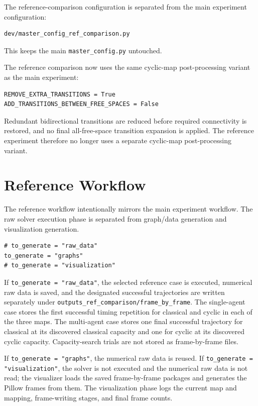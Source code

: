 \documentclass[11pt]{article}
\begin{document}
The reference-comparison configuration is separated from the main experiment configuration:

\begin{lstlisting}
dev/master_config_ref_comparison.py
\end{lstlisting}

This keeps the main \texttt{master\_config.py} untouched.

The reference comparison now uses the same cyclic-map post-processing variant as the main experiment:

\begin{lstlisting}
REMOVE_EXTRA_TRANSITIONS = True
ADD_TRANSITIONS_BETWEEN_FREE_SPACES = False
\end{lstlisting}

Redundant bidirectional transitions are reduced before required connectivity is restored, and no final all-free-space transition expansion is applied. The reference experiment therefore no longer uses a separate cyclic-map post-processing variant.

\section{Reference Workflow}

The reference workflow intentionally mirrors the main experiment workflow. The raw solver execution phase is separated from graph/data generation and visualization generation.

\begin{lstlisting}
# to_generate = "raw_data"
to_generate = "graphs"
# to_generate = "visualization"
\end{lstlisting}

If \texttt{to\_generate = "raw\_data"}, the selected reference case is executed, numerical raw data is saved, and the designated successful trajectories are written separately under \texttt{outputs\_ref\_comparison/frame\_by\_frame}. The single-agent case stores the first successful timing repetition for classical and cyclic in each of the three maps. The multi-agent case stores one final successful trajectory for classical at its discovered classical capacity and one for cyclic at its discovered cyclic capacity. Capacity-search trials are not stored as frame-by-frame files.

If \texttt{to\_generate = "graphs"}, the numerical raw data is reused. If \texttt{to\_generate = "visualization"}, the solver is not executed and the numerical raw data is not read; the visualizer loads the saved frame-by-frame packages and generates the Pillow frames from them. The visualization phase logs the current map and mapping, frame-writing stages, and final frame counts.
\end{document}
